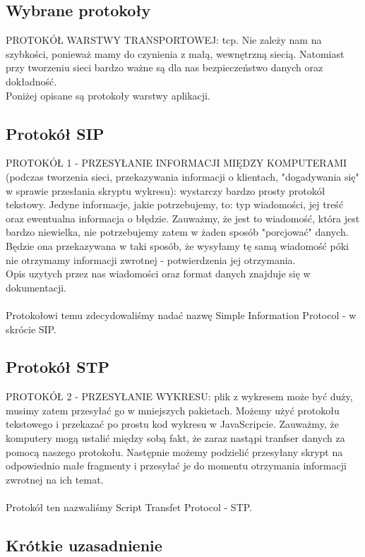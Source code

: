 \subsection{Wybrane protokoły}

PROTOKÓŁ WARSTWY TRANSPORTOWEJ: tcp. Nie zależy nam na szybkości, ponieważ mamy do czynienia z małą, wewnętrzną siecią. Natomiast przy tworzeniu sieci bardzo ważne są dla nas bezpieczeństwo danych oraz dokładność.\\
Poniżej opisane są protokoły warstwy aplikacji.

\subsection{Protokół SIP}

PROTOKÓŁ 1 - PRZESYŁANIE INFORMACJI MIĘDZY KOMPUTERAMI (podczas tworzenia sieci, przekazywania informacji o klientach, "dogadywania się" w sprawie przesłania skryptu wykresu): wystarczy bardzo prosty protokół tekstowy. Jedyne informacje, jakie potrzebujemy, to: typ wiadomości, jej treść oraz ewentualna informacja o błędzie. Zauważmy, że jest to wiadomość, która jest bardzo niewielka, nie potrzebujemy zatem w żaden sposób "porcjować" danych. Będzie ona przekazywana w taki sposób, że wysyłamy tę samą wiadomość póki nie otrzymamy informacji zwrotnej - potwierdzenia jej otrzymania. \\
Opis uzytych przez nas wiadomości oraz format danych znajduje się w dokumentacji.\\
\\
Protokołowi temu zdecydowaliśmy nadać nazwę Simple Information Protocol - w skrócie SIP.

\subsection{Protokół STP}
PROTOKÓŁ 2 - PRZESYŁANIE WYKRESU: plik z wykresem może być duży, musimy zatem przesyłać go w mniejszych pakietach. Możemy użyć protokołu tekstowego i przekazać po prostu kod wykresu w JavaScripcie. Zauważmy, że komputery mogą ustalić między sobą fakt, że zaraz nastąpi tranfser danych za pomocą naszego protokołu. Następnie możemy podzielić przesyłany skrypt na odpowiednio małe fragmenty i przesyłać je do momentu otrzymania informacji zwrotnej na ich temat.\\
\\
Protokół ten nazwaliśmy Script Transfet Protocol - STP.

\subsection{Krótkie uzasadnienie}

